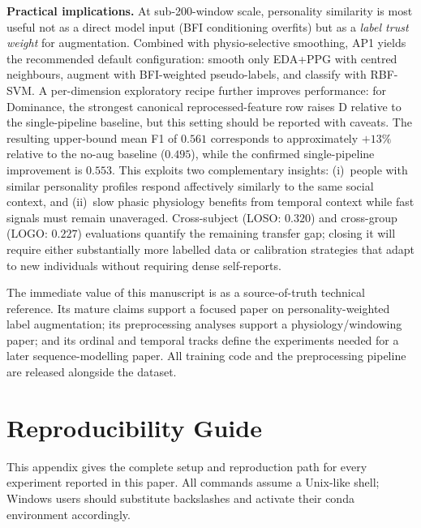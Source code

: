 \documentclass[sigconf,nonacm]{acmart}
\begin{document}
\textbf{Practical implications.}
At sub-200-window scale, personality similarity is most useful not as a
direct model input (BFI conditioning overfits) but as a \emph{label trust
weight} for augmentation.
Combined with physio-selective smoothing, AP1 yields the recommended
default configuration: smooth only EDA+PPG with centred neighbours,
augment with BFI-weighted pseudo-labels, and classify with RBF-SVM.
A per-dimension exploratory recipe further improves performance: for Dominance,
the strongest canonical reprocessed-feature row raises D relative to the
single-pipeline baseline, but this setting should be reported with caveats.
The resulting upper-bound mean F1 of $0.561$ corresponds to
approximately $+13\%$ relative to the no-aug baseline ($0.495$), while the
confirmed single-pipeline improvement is $0.553$.
This exploits two complementary insights: (i)~people with similar
personality profiles respond affectively similarly to the same social
context, and (ii)~slow phasic physiology benefits from temporal context
while fast signals must remain unaveraged.
Cross-subject (LOSO: $0.320$) and cross-group (LOGO: $0.227$) evaluations
quantify the remaining transfer gap; closing it will require either
substantially more labelled data or calibration strategies that adapt to
new individuals without requiring dense self-reports.

The immediate value of this manuscript is as a source-of-truth technical
reference.
Its mature claims support a focused paper on personality-weighted label
augmentation; its preprocessing analyses support a physiology/windowing paper;
and its ordinal and temporal tracks define the experiments needed for a later
sequence-modelling paper.
All training code and the preprocessing pipeline are released alongside the
dataset.


\appendix

\section{Reproducibility Guide}
\label{sec:appendix_repro}

This appendix gives the complete setup and reproduction path for every
experiment reported in this paper.
All commands assume a Unix-like shell; Windows users should substitute
backslashes and activate their conda environment accordingly.
\end{document}
